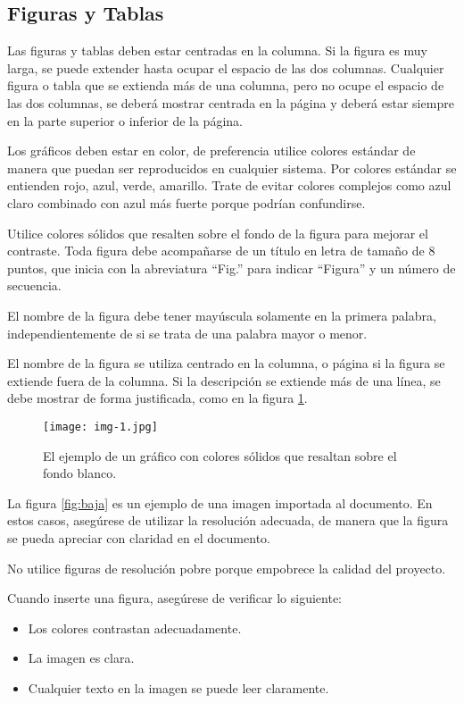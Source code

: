 \subsection{Figuras y Tablas}
Las figuras y tablas deben estar centradas en la columna. Si la figura es muy larga,
se puede extender hasta ocupar el espacio de las dos columnas. Cualquier figura o
tabla que se extienda más de una columna, pero no ocupe el espacio de las dos
columnas, se deberá mostrar centrada en la página y deberá estar siempre en la parte
superior o inferior de la página.

Los gráficos deben estar en color, de preferencia utilice colores estándar de
manera que puedan ser reproducidos en cualquier sistema. Por colores estándar se
entienden rojo, azul, verde, amarillo. Trate de evitar colores complejos como azul
claro combinado con azul más fuerte porque podrían confundirse.

Utilice colores sólidos que resalten sobre el fondo de la figura para mejorar el
contraste. Toda figura debe acompañarse de un título en letra de tamaño de 8
puntos, que inicia con la abreviatura “Fig.” para indicar “Figura” y un número de
secuencia.

El nombre de la figura debe tener mayúscula solamente en la primera palabra,
independientemente de si se trata de una palabra mayor o menor.

El nombre de la figura se utiliza centrado en la columna, o página si la figura se
extiende fuera de la columna. Si la descripción se extiende más de una línea, se
debe mostrar de forma justificada, como en la figura \ref{fig:grafico}.

\begin{figure}[h]
	\centering
	\texttt{[image: img-1.jpg]}
	\caption{\footnotesize El ejemplo de un gráfico con colores sólidos que
		resaltan sobre el fondo blanco.}
	\label{fig:grafico}
\end{figure}

La figura \ref{fig:baja} es un ejemplo de una imagen importada al documento. En
estos casos, asegúrese de utilizar la resolución adecuada, de manera que la
figura se pueda apreciar con claridad en el documento.

No utilice figuras de resolución pobre porque empobrece la calidad del proyecto.

Cuando inserte una figura, asegúrese de verificar lo siguiente:

\begin{itemize}
	\item Los colores contrastan adecuadamente.

	\item La imagen es clara.

	\item Cualquier texto en la imagen se puede leer claramente.
\end{itemize}

